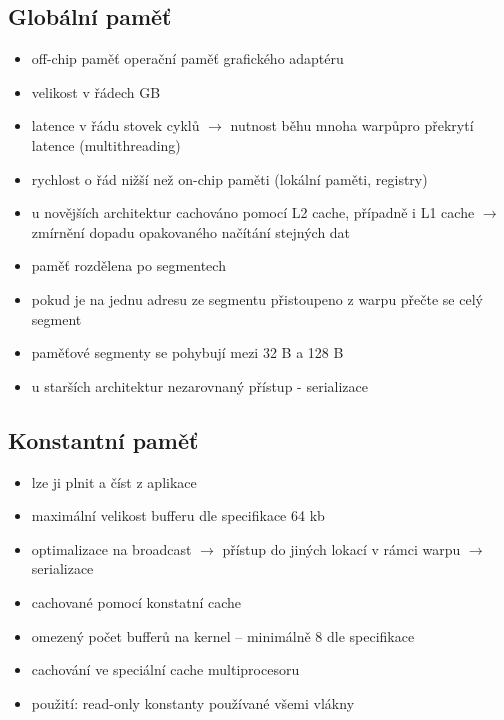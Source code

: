 	\subsection*{Globální paměť}
	\begin{itemize}
		\setlength\itemsep{0em}
		\item off-chip paměť operační paměť grafického adaptéru
		\item velikost v řádech GB
		\item latence v řádu stovek cyklů $\rightarrow$ nutnost běhu mnoha warpůpro překrytí latence (multithreading)
		\item rychlost o řád nižší než on-chip paměti (lokální paměti, registry)
		\item u novějších architektur cachováno pomocí L2 cache, případně i L1 cache $\rightarrow$ zmírnění dopadu opakovaného načítání stejných dat
		\item paměť rozdělena po segmentech
		\item pokud je na jednu adresu ze segmentu přistoupeno z warpu přečte se celý segment
		\item paměťové segmenty se pohybují mezi 32 B a 128 B
		\item u starších architektur nezarovnaný přístup - serializace
	\end{itemize}

	\subsection*{Konstantní paměť}
		\label{subsec:konstantni_pamet}
		\begin{itemize}
			\setlength\itemsep{0em}
			\item lze ji plnit a číst z aplikace
			\item maximální velikost bufferu dle specifikace 64 kb
			\item optimalizace na broadcast $\rightarrow$ přístup do jiných lokací v rámci warpu $\rightarrow$ serializace
			\item cachované pomocí konstatní cache
			\item omezený počet bufferů na kernel -- minimálně 8 dle specifikace
			\item cachování ve speciální cache multiprocesoru
			\item použití: read-only konstanty používané všemi vlákny
		\end{itemize}

